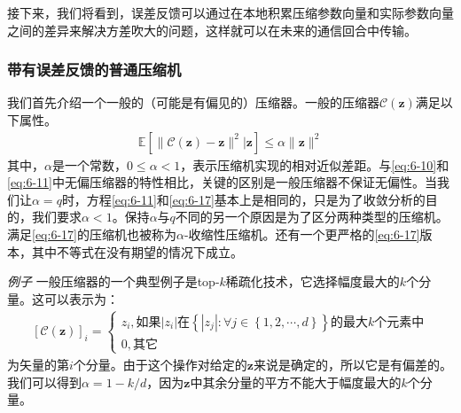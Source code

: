接下来，我们将看到，误差反馈可以通过在本地积累压缩参数向量和实际参数向量之间的差异来解决方差吹大的问题，这样就可以在未来的通信回合中传输。

\subsubsection{带有误差反馈的普通压缩机}
我们首先介绍一个一般的（可能是有偏见的）压缩器。一般的压缩器$\mathcal{C}(\bm{z})$满足以下属性。
\begin{align}\label{eq:6-17}
	\mathbb{E}[\|\mathcal{C}(\bm{z}) - \bm{z}\|^{2} | \bm{z}] \le \alpha \|\bm{z}\|^{2}
\end{align}
其中，$\alpha$是一个常数，$0 \le \alpha < 1$，表示压缩机实现的相对近似差距。与\ref{eq:6-10}和\ref{eq:6-11}中无偏压缩器的特性相比，关键的区别是一般压缩器不保证无偏性。当我们让$\alpha=q$时，方程\ref{eq:6-11}和\ref{eq:6-17}基本上是相同的，只是为了收敛分析的目的，我们要求$\alpha<1$。保持$α$与$q$不同的另一个原因是为了区分两种类型的压缩机。满足\ref{eq:6-17}的压缩机也被称为$α$-收缩性压缩机。还有一个更严格的\ref{eq:6-17}版本，其中不等式在没有期望的情况下成立。

\textit{例子} 一般压缩器的一个典型例子是top-$k$稀疏化技术，它选择幅度最大的$k$个分量。这可以表示为：
\begin{align}\label{eq:6-18}
	[\mathcal{C}(\bm{z})]_{i} = \left\{\begin{matrix}
		z_{i}, \text{如果}|z_{i}|\text{在}\left\{|z_{j}|: \forall j \in \left\{1, 2, \cdots, d\right\}\right\}\text{的最大}k\text{个元素中} \\
		0, 其它
	\end{matrix}\right.
\end{align}
为矢量的第$i$个分量。由于这个操作对给定的$\bm{z}$来说是确定的，所以它是有偏差的。我们可以得到$\alpha=1-k/d$，因为$\bm{z}$中其余分量的平方不能大于幅度最大的$k$个分量。

